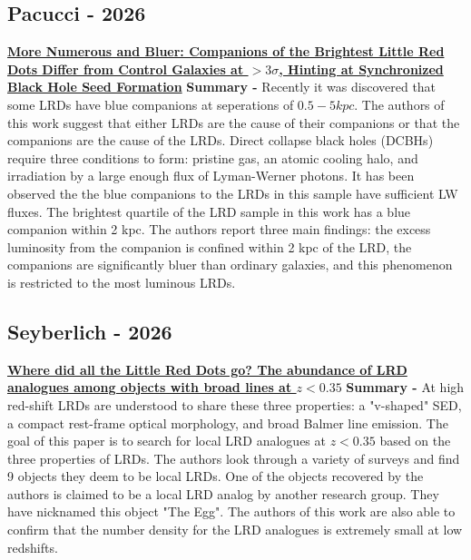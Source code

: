 \documentclass{article}
\begin{document}
\subsection*{Pacucci - 2026}
\href{https://ui.adsabs.harvard.edu/abs/2026arXiv260823671P/abstract}{\textbf{More Numerous and Bluer: Companions of the Brightest Little Red Dots Differ from Control Galaxies at $> 3\sigma$, Hinting at Synchronized Black Hole Seed Formation}}
\newline \textbf{Summary -} Recently it was discovered that some LRDs have blue companions at seperations of $0.5 -5 kpc$. The authors of this work suggest that either LRDs are the cause of their companions or that the companions are the cause of the LRDs. Direct collapse black holes (DCBHs) require three conditions to form: pristine gas, an atomic cooling halo, and irradiation by a large enough flux of Lyman-Werner photons. It has been observed the the blue companions to the LRDs in this sample have sufficient LW fluxes. The brightest quartile of the LRD sample in this work has a blue companion within 2 kpc. The authors report three main findings: the excess luminosity from the companion is confined within 2 kpc of the LRD, the companions are significantly bluer than ordinary galaxies, and this phenomenon is restricted to the most luminous LRDs.

\subsection*{Seyberlich - 2026}
\href{https://ui.adsabs.harvard.edu/abs/2026arXiv260805267S}{\textbf{Where did all the Little Red Dots go? The abundance of LRD analogues among objects with broad lines at $z < 0.35$}}
\newline \textbf{Summary -} At high red-shift LRDs are understood to share these three properties: a "v-shaped" SED, a compact rest-frame optical morphology, and broad Balmer line emission. The goal of this paper is to search for local LRD analogues at $z < 0.35$ based on the three properties of LRDs. The authors look through a variety of surveys and find 9 objects they deem to be local LRDs. One of the objects recovered by the authors is claimed to be a local LRD analog by another research group. They have nicknamed this object "The Egg". The authors of this work are also able to confirm that the number density for the LRD analogues is extremely small at low redshifts. 
\end{document}
